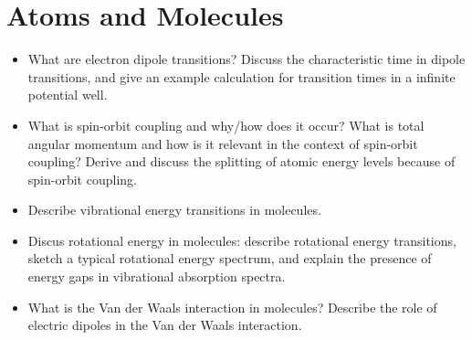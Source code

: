 \section{Atoms and Molecules}
\begin{itemize}

    \item What are electron dipole transitions?
    Discuss the characteristic time in dipole transitions, and give an example calculation for transition times in a infinite potential well.

    \item What is spin-orbit coupling and why/how does it occur?
    What is total angular momentum and how is it relevant in the context of spin-orbit coupling?
    Derive and discuss the splitting of atomic energy levels because of spin-orbit coupling.

    \item Describe vibrational energy transitions in molecules.

    \item Discus rotational energy in molecules:
    describe rotational energy transitions, sketch a typical rotational energy spectrum, and explain the presence of energy gaps in vibrational absorption spectra.

    \item What is the Van der Waals interaction in molecules?
    Describe the role of electric dipoles in the Van der Waals interaction.

\end{itemize}

